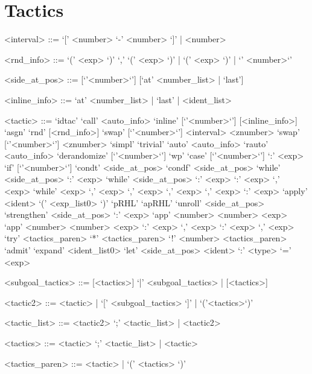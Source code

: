 \section{Tactics}
\begin{ecgrammar}
<interval> ::= `[' <number> `-' <number> `]' | <number> 

<rnd_info> ::= `(' <exp> `)' `,' `(' <exp> `)' | `(' <exp> `)' | `{' <number>`}'

<side_at_pos> ::= [`{'<number>`}'] [`at' <number_list> | `last']
 
<inline_info> ::= `at' <number_list> | `last' | <ident_list>

<tactic> ::= `idtac'
 \alt `call' <auto_info>
 \alt `inline' [`{'<number>`}'] [<inline_info>]
 \alt `asgn'
 \alt `rnd' [<rnd_info>]
 \alt `swap' [`{'<number>`}'] <interval> <znumber> 
 \alt `swap' [`{'<number>`}'] <znumber>  
 \alt `simpl'
 \alt `trivial'
 \alt `auto'  <auto_info>
 \alt `rauto' <auto_info>
 \alt `derandomize' [`{'<number>`}']
 \alt `wp'
 \alt `case'  [`{'<number>`}'] `:' <exp>
 \alt `if'    [`{'<number>`}']
 \alt `condt'   <side_at_pos> 
 \alt `condf'   <side_at_pos> 
 \alt `while' <side_at_pos> `:' <exp>
 \alt `while' <side_at_pos> `:' <exp> `:' <exp> `,' <exp> 
 \alt `while' <exp> `,' <exp> `,' <exp>  `,' <exp> `,' <exp> `:' <exp>     
 \alt `apply' <ident> `(' <exp_list0> `)'
 \alt `pRHL'
 \alt `apRHL'
 \alt `unroll'     <side_at_pos>
 \alt `strengthen' <side_at_pos>  `:' <exp>
 \alt `app' <number> <number> <exp>
 \alt `app' <number> <number> <exp> `:' <exp> `,' <exp> `:' <exp> `,' <exp> 
 \alt `try' <tactics_paren>
 \alt `*' <tactics_paren>
 \alt `!' <number> <tactics_paren>
 \alt `admit'
 \alt `expand' <ident_list0>
 \alt `let' <side_at_pos>  <ident> `:' <type> `=' <exp> 


<subgoal_tactics> ::= [<tactics>] `|' <subgoal_tactics> | [<tactics>]

<tactic2> ::= <tactic> | `[' <subgoal_tactics> `]' | `('<tactics>`)'

<tactic_list> ::= <tactic2> `;' <tactic_list> | <tactic2>

<tactics> ::= <tactic> `;' <tactic_list> | <tactic>

<tactics_paren> ::= <tactic> | `(' <tactics> `)'

\end{ecgrammar}

